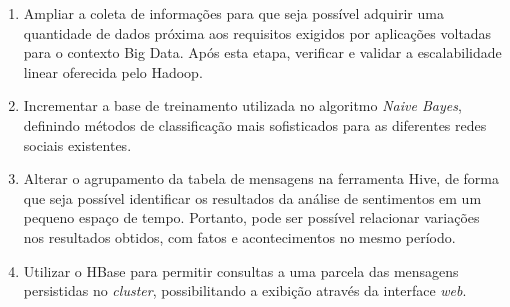 \begin{enumerate}

  \item Ampliar a coleta de informações para que seja possível adquirir uma quantidade de dados próxima aos requisitos exigidos por aplicações voltadas para o contexto Big Data. Após esta etapa, verificar e validar a escalabilidade linear oferecida pelo Hadoop.
  \item Incrementar a base de treinamento utilizada no algoritmo \textit{Naive Bayes}, definindo métodos de classificação mais sofisticados para as diferentes redes sociais existentes.
  \item Alterar o agrupamento da tabela de mensagens na ferramenta Hive, de forma que seja possível identificar os resultados da análise de sentimentos em um pequeno espaço de tempo. Portanto, pode ser possível relacionar variações nos resultados obtidos, com fatos e acontecimentos no mesmo período.
  \item Utilizar o HBase para permitir consultas a uma parcela das mensagens persistidas no \textit{cluster}, possibilitando a exibição através da interface \textit{web}.

\end{enumerate}


